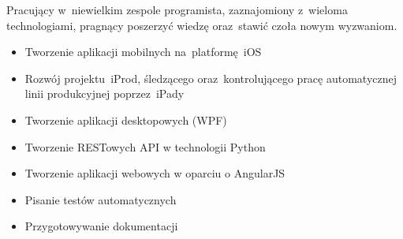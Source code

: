 \documentclass[11pt,a4paper]{article}
\begin{document}
    \bigskip

  
    \smallskip

    \noindent
    Pracujący w~niewielkim zespole programista, zaznajomiony z~wieloma technologiami, pragnący poszerzyć wiedzę oraz~stawić czoła nowym wyzwaniom.
  

    \bigskip


    \smallskip

    \vspace{-0.2cm}
    \begin{itemize} \itemsep1pt \parskip0pt 
        \item Tworzenie aplikacji mobilnych na~platformę~iOS
        \item Rozwój projektu~iProd, śledzącego oraz~kontrolującego pracę automatycznej linii produkcyjnej poprzez~iPady
        \item Tworzenie aplikacji desktopowych (WPF)
        \item Tworzenie RESTowych API w technologii Python
        \item Tworzenie aplikacji webowych w oparciu o AngularJS
        \item Pisanie testów automatycznych
        \item Przygotowywanie dokumentacji
    \end{itemize}


    \medskip
  
  
    \smallskip
\end{document}

